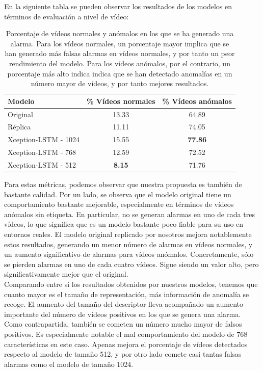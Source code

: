 \documentclass[../main.tex]{memoir}
\begin{document}
En la siguiente tabla se pueden observar los resultados de los modelos
en términos de evaluación a nivel de vídeo:

\begin{table}[H]
  \centering
  \begin{tabular}{lcc}
    \toprule
    Modelo & \% Vídeos normales  & \% Vídeos anómalos \\
    \midrule
    Original & 13.33 & 64.89 \\
    Réplica & 11.11 & 74.05 \\
    Xception-LSTM - 1024 & 15.55 & \textbf{77.86} \\
    Xception-LSTM - 768 & 12.59 & 72.52 \\
    Xception-LSTM - 512 & \textbf{8.15} & 71.76 \\
    \bottomrule
  \end{tabular}
  \caption{Porcentaje de vídeos normales y anómalos en los que se ha
    generado una alarma. Para los vídeos normales, un porcentaje mayor
    implica que se han generado más falsas alarmas en vídeos normales,
    y por tanto un peor rendimiento del modelo. Para los vídeos
    anómalos, por el contrario, un porcentaje más alto indica indica
    que se han detectado anomalías en un número mayor de vídeos, y por
    tanto mejores resultados.}
  \label{tab:video-level-predictions}
\end{table}

Para estas métricas, podemos observar que nuestra propuesta es también
de bastante calidad. Por un lado, se observa que el modelo original
tiene un comportamiento bastante mejorable, especialmente en términos
de vídeos anómalos sin etiqueta. En particular, no se generan alarmas
en uno de cada tres vídeos, lo que significa que es un modelo bastante
poco fiable para su uso en entornos reales. El modelo original
replicado por nosotros mejora notablemente estos resultados, generando
un menor número de alarmas en vídeos normales, y un aumento
significativo de alarmas para vídeos anómalos. Concretamente, sólo se
pierden alarmas en uno de cada cuatro vídeos. Sigue siendo un valor
alto, pero significativamente mejor que el original.\\

Comparando entre si los resultados obtenidos por nuestros modelos,
tenemos que cuanto mayor es el tamaño de representación, más
información de anomalía se recoge. El aumento del tamaño del
descriptor lleva acompañado un aumento importante del número de vídeos
positivos en los que se genera una alarma. Como contrapartida, también
se cometen un número mucho mayor de falsos positivos. Es especialmente
notable el mal comportamiento del modelo de 768 características en
este caso. Apenas mejora el porcentaje de vídeos detectados respecto
al modelo de tamaño 512, y por otro lado comete casi tantas falsas
alarmas como el modelo de tamaño 1024.\\
\end{document}
